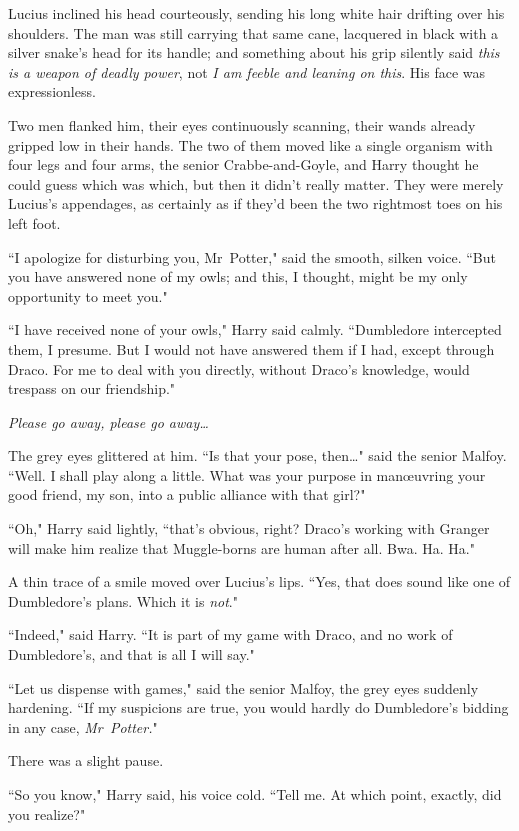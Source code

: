 Lucius inclined his head courteously, sending his long white hair drifting over his shoulders. The man was still carrying that same cane, lacquered in black with a silver snake's head for its handle; and something about his grip silently said \emph{this is a weapon of deadly power}, not \emph{I am feeble and leaning on this}. His face was expressionless.

Two men flanked him, their eyes continuously scanning, their wands already gripped low in their hands. The two of them moved like a single organism with four legs and four arms, the senior Crabbe-and-Goyle, and Harry thought he could guess which was which, but then it didn't really matter. They were merely Lucius's appendages, as certainly as if they'd been the two rightmost toes on his left foot.

``I apologize for disturbing you, Mr~Potter," said the smooth, silken voice. ``But you have answered none of my owls; and this, I thought, might be my only opportunity to meet you."

``I have received none of your owls," Harry said calmly. ``Dumbledore intercepted them, I presume. But I would not have answered them if I had, except through Draco. For me to deal with you directly, without Draco's knowledge, would trespass on our friendship."

\emph{Please go away, please go away{\ldots}}

The grey eyes glittered at him. ``Is that your pose, then{\ldots}" said the senior Malfoy. ``Well. I shall play along a little. What was your purpose in manœuvring your good friend, my son, into a public alliance with that girl?"

``Oh," Harry said lightly, ``that's obvious, right? Draco's working with Granger will make him realize that Muggle-borns are human after all. Bwa. Ha. Ha."

A thin trace of a smile moved over Lucius's lips. ``Yes, that does sound like one of Dumbledore's plans. Which it is \emph{not}."

``Indeed," said Harry. ``It is part of my game with Draco, and no work of Dumbledore's, and that is all I will say."

``Let us dispense with games," said the senior Malfoy, the grey eyes suddenly hardening. ``If my suspicions are true, you would hardly do Dumbledore's bidding in any case, \emph{Mr~Potter.}"

There was a slight pause.

``So you know," Harry said, his voice cold. ``Tell me. At which point, exactly, did you realize?"

